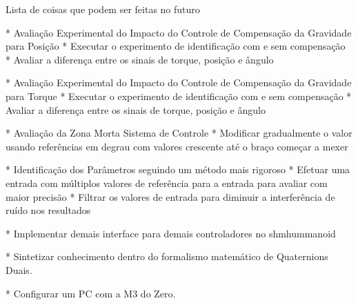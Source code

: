 Lista de coisas que podem ser feitas no futuro

* Avaliação Experimental do Impacto do Controle de Compensação da Gravidade para Posição
  * Executar o experimento de identificação com e sem compensação
  * Avaliar a diferença entre os sinais de torque, posição e ângulo
 
* Avaliação Experimental do Impacto do Controle de Compensação da Gravidade para Torque
  * Executar o experimento de identificação com e sem compensação
  * Avaliar a diferença entre os sinais de torque, posição e ângulo

* Avaliação da Zona Morta Sistema de Controle
 * Modificar gradualmente o valor usando referências em degrau com valores crescente até o braço começar a mexer
 
* Identificação dos Parâmetros seguindo um método mais rigoroso
 * Efetuar uma entrada com múltiplos valores de referência para a entrada para avaliar com maior precisão
 * Filtrar os valores de entrada para diminuir a interferência de ruído nos resultados
 
* Implementar demais interface para demais controladores no shmhummanoid
 
* Sintetizar conhecimento dentro do formalismo matemático de Quaternions Duais.

* Configurar um PC com a M3 do Zero.